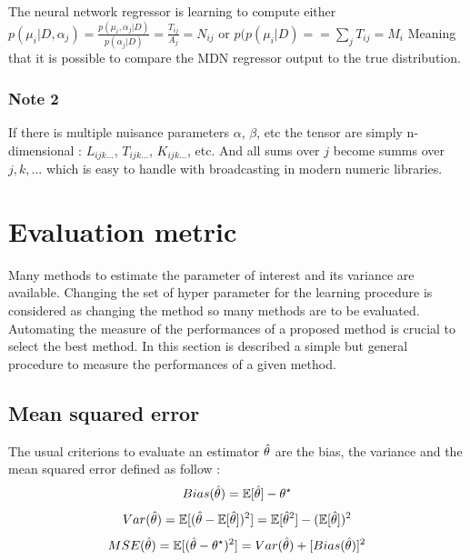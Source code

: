 The neural network regressor is learning to compute either $p(\mu_i |D, \alpha_j) = \frac{p(\mu_i, \alpha_j | D)}{p(\alpha_j | D)} = \frac{T_{ij}}{A_j} = N_{ij}$ or $p(p(\mu_i |D) = = \sum_j T_{ij} = M_i$
Meaning that it is possible to compare the MDN regressor output to the true distribution.


\subsubsection{Note 2}

If there is multiple nuisance parameters $\alpha$, $\beta$, etc the tensor are simply n-dimensional : $L_{ijk...}$, $T_{ijk...}$, $K_{ijk...}$, etc.
And all sums over $j$ become summs over $j,k, ...$ which is easy to handle with broadcasting in modern numeric libraries.










\section{Evaluation metric} %
\label{sec:evaluation_metric}


Many methods to estimate the parameter of interest and its variance are available.
Changing the set of hyper parameter for the learning procedure is considered as changing the method so many methods are to be evaluated.
Automating the measure of the performances of a proposed method is crucial to select the best method.
In this section is described a simple but general procedure to measure the performances of a given method.


\subsection{Mean squared error} %
\label{sub:mean_squared_error}


The usual criterions to evaluate an estimator $\hat\theta$ are the bias, the variance and the mean squared error defined as follow :
\begin{equation}
  Bias(\hat\theta) = \mathbb{E}[\hat\theta] - \theta^\star
\end{equation}
\begin{equation}
  Var(\hat\theta) = \mathbb{E}[ (\hat\theta - \mathbb{E}[\hat\theta])^2 ] = \mathbb{E}[\hat\theta^2] - (\mathbb{E}[\hat\theta])^2
\end{equation}
\begin{equation}
  MSE(\hat\theta) = \mathbb{E}[(\hat\theta - \theta^\star)^2] = Var(\hat\theta) + [Bias(\hat\theta)]^2
\end{equation}

